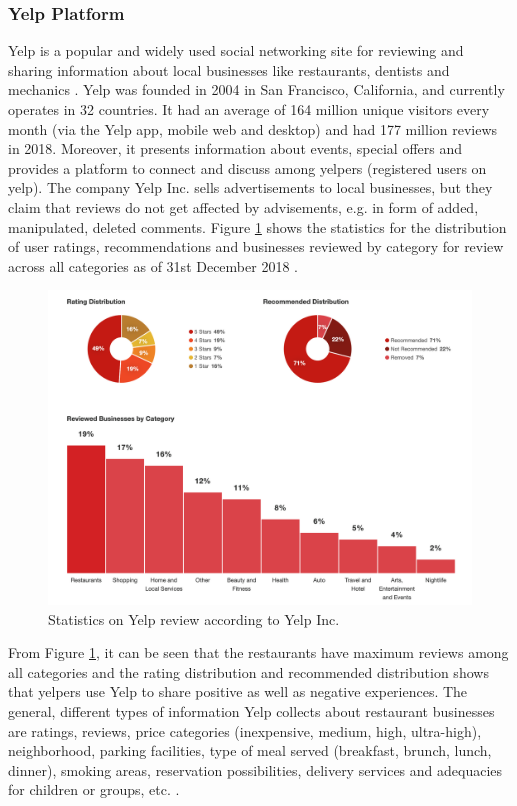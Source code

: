\documentclass[a4paper, 11pt, oneside]{Thesis}  %
\begin{document}
\subsubsection{Yelp Platform}

Yelp is a popular and widely used social networking site for reviewing and sharing information about local businesses like restaurants, dentists and mechanics \cite{YelpInc..2018}. Yelp was founded in 2004 in San Francisco, California, and currently operates in 32 countries. It had an average of 164 million unique visitors every month (via the Yelp app, mobile web and desktop) and had 177 million reviews in 2018. Moreover, it presents information about events, special offers and provides a platform to connect and discuss among yelpers (registered users on yelp). The company Yelp Inc. sells advertisements to local businesses, but they claim that reviews do not get affected by advisements, e.g. in form of added, manipulated, deleted comments. Figure \ref{fig:yelp_factsheet_figures} shows the statistics for the distribution of user ratings, recommendations and businesses reviewed by category for review across all categories as of 31st December 2018 \cite{YelpInc..2018}.

\begin{figure}[h]
\includegraphics[scale=0.5]{Figures/Yelp_Factsheet_Figures.png}
\centering
\caption{Statistics on Yelp review according to Yelp Inc. \cite{YelpInc..2018}}
\label{fig:yelp_factsheet_figures}
\end{figure}

From Figure \ref{fig:yelp_factsheet_figures}, it can be seen that the restaurants have maximum reviews among all categories and the rating distribution and recommended distribution shows that yelpers use Yelp to share positive as well as negative experiences. The general, different types of information Yelp collects about restaurant businesses are ratings, reviews, price categories (inexpensive, medium, high, ultra-high), neighborhood, parking facilities, type of meal served (breakfast, brunch, lunch, dinner), smoking areas, reservation possibilities, delivery services and adequacies for children or groups, etc. \cite{YelpInc..2018}.  
\end{document}
